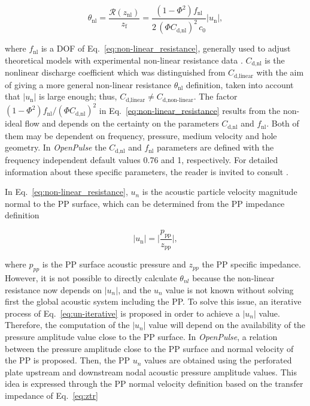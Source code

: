 \documentclass[12pt]{article}
\begin{document}
\begin{equation} \label{eq:non-linear_resistance}
	\theta_{\text{nl}} = \frac{ \mathcal{R} (z_{\text{nl}}) }{  z_{\text{f}} }= \frac{(1 - \Phi^2) f_{\text{nl}}}{2 \, (\Phi C_{\text{d,nl}})^2 \, c_0 } |u_{\text{n}}|,
\end{equation}

\noindent where $f_{\text{nl}}$ is a \acrshort{DOF} of Eq.~\ref{eq:non-linear_resistance}, generally used to adjust theoretical models with experimental non-linear resistance data \cite{elnady_2003}. $C_{\text{d,nl}}$ is the nonlinear discharge coefficient which was distinguished from $C_{\text{d,linear}}$ with the aim of giving a more general non-linear resistance $\theta_{\text{nl}}$ definition, taken into account that $|u_{\text{n}}|$ is large enough; thus, $C_{\text{d,linear}} \neq C_{\text{d,non-linear}}$. The factor $(1 - \Phi^2) f_{\text{nl}} / (\Phi C_{\text{d,nl}})^2$ in Eq.~\ref{eq:non-linear_resistance} results from the non-ideal flow \cite{MELLING19731} and depends on the certainty on the parameters $C_{\text{d,nl}}$ and $f_{\text{nl}}$. Both of them may be dependent on frequency, pressure, medium velocity and hole geometry. In \textit{OpenPulse} the $C_{\text{d,nl}}$ and $f_{\text{nl}}$ parameters are defined with the frequency independent default values 0.76 and 1, respectively. For detailed information about these specific parameters, the reader is invited to consult \cite{elnady_2003,elnady_thesis,discharge_zhou,TEMIZ}.

In Eq.~\ref{eq:non-linear_resistance}, $u_n$ is the acoustic particle velocity magnitude normal to the \acrshort{PP} surface, which can be determined from the \acrshort{PP} impedance definition

\begin{equation} \label{eq:un-iterative}
	| u_{\text{n}} | = \Big| \frac{ p_{\text{pp}} }{z_{\text{pp}}} \Big|,
\end{equation}

\noindent where $p_{pp}$ is the \acrshort{PP} surface acoustic pressure and $z_{pp}$ the \acrshort{PP} specific impedance. However, it is not possible to directly calculate $\theta_{nl}$ because the non-linear resistance now depends on $|u_n|$, and the $u_n$ value is not known without solving first the global acoustic system including the \acrshort{PP}. To solve this issue, an iterative process of Eq.~\ref{eq:un-iterative} is proposed in order to achieve a $|u_n|$ value. Therefore, the computation of the $|u_n|$ value will depend on the availability of the pressure amplitude value close to the \acrshort{PP} surface.  In \textit{OpenPulse}, a relation between the pressure amplitude close to the \acrshort{PP} surface and normal velocity of the \acrshort{PP} is proposed. Then, the \acrshort{PP} $u_n$ values are obtained using the perforated plate upstream and downstream nodal acoustic pressure amplitude values. This idea is expressed through the \acrshort{PP} normal velocity definition based on the transfer impedance of Eq.~\ref{eq:ztr}
\end{document}
